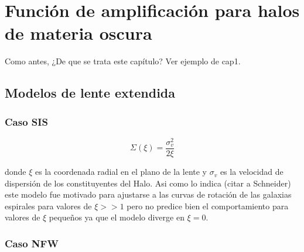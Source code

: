\chapter{Función de amplificación para halos de materia oscura}
\label{cap:1}
\setcounter{equation}{0}


{\red Como antes, ¿De que se trata este capítulo? Ver ejemplo de cap1.}


\section{\red Modelos de lente extendida}



\subsection{Caso SIS}

\begin{equation} \label{eq:smd}
\Sigma(\xi)=\frac{\sigma_{v}^{2}}{2\xi}
\end{equation}

donde $\xi$ es la coordenada radial en el plano de la lente y $\sigma_{v}$ es la velocidad de dispersi\'on de los constituyentes del Halo. Asi como lo indica (citar a Schneider) este modelo fue motivado para ajustarse a las curvas de rotaci\'on de las galaxias espirales para valores de $\xi >> 1$ pero no predice bien el comportamiento para valores de $\xi$ pequeños ya que el modelo diverge en $\xi = 0$.


\subsection{Caso NFW}

